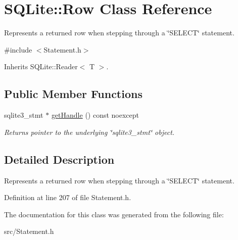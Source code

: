 \hypertarget{a00006}{\section{S\-Q\-Lite\-:\-:Row Class Reference}
\label{a00006}
}


Represents a returned row when stepping through a \char`\"{}\-S\-E\-L\-E\-C\-T\char`\"{} statement.  




{\ttfamily \#include $<$Statement.\-h$>$}



Inherits S\-Q\-Lite\-::\-Reader$<$ T $>$.

\subsection*{Public Member Functions}
\begin{DoxyCompactItemize}
\item 
\hypertarget{a00006_a0cdd34663266ff8c19ee1313a87d51f0}{sqlite3\-\_\-stmt $\ast$ \hyperlink{a00006_a0cdd34663266ff8c19ee1313a87d51f0}{get\-Handle} () const noexcept}\label{a00006_a0cdd34663266ff8c19ee1313a87d51f0}

\begin{DoxyCompactList}\small\item\em Returns pointer to the underlying \char`\"{}sqlite3\-\_\-stmt\char`\"{} object. \end{DoxyCompactList}\end{DoxyCompactItemize}


\subsection{Detailed Description}
Represents a returned row when stepping through a \char`\"{}\-S\-E\-L\-E\-C\-T\char`\"{} statement. 



Definition at line 207 of file Statement.\-h.



The documentation for this class was generated from the following file\-:\begin{DoxyCompactItemize}
\item 
src/Statement.\-h\end{DoxyCompactItemize}
